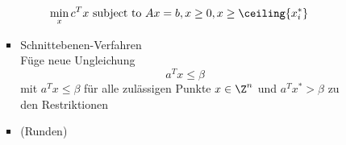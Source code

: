 \begin{beispiel}
\begin{enumerate}
\begin{itemize}
\begin{enumerate}[label = \arabic*. Fall:]
\begin{itemize}
\begin{align*}
						\min_{x} c^{T} &x \text{ subject to } Ax = b , x\geq 0 , x\geq \ceiling{x_{i}^*}
					\end{align*}
					\item Schnittebenen-Verfahren\\
					Füge neue Ungleichung 
					\begin{equation*}
						a^{T} x \leq \beta
					\end{equation*}
					mit $a^{T} x \leq \beta$ für alle zulässigen Punkte $x \in \Z^n$ und $a^{T} x^* > \beta $ zu den Restriktionen		
					\item (Runden)
				\end{itemize}
			\end{enumerate}
		\end{itemize}
\end{enumerate}
 
  
\end{beispiel}


